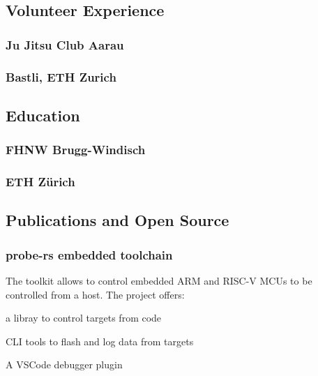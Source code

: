 \begin{timeline}
    \subsection{Volunteer Experience}
    
    \subsubsection{Ju Jitsu Club Aarau}
    \sectionsep

    \subsubsection{Bastli, ETH Zurich}
    \sectionsep

    
    \subsection{Education}
    
    \subsubsection{FHNW Brugg-Windisch}
    \sectionsep
    
    \subsubsection{ETH Zürich}
    \sectionsep
    
    
    \subsection{Publications and Open Source}

    \subsubsection{probe-rs embedded toolchain}
    The toolkit allows to control embedded ARM and RISC-V MCUs to be controlled from a host.
    The project offers:\\
    \begin{tightemize}
    \item a libray to control targets from code
    \item CLI tools to flash and log data from targets
    \item A VSCode debugger plugin
    \end{tightemize}
    \sectionsep
    

\end{timeline}

